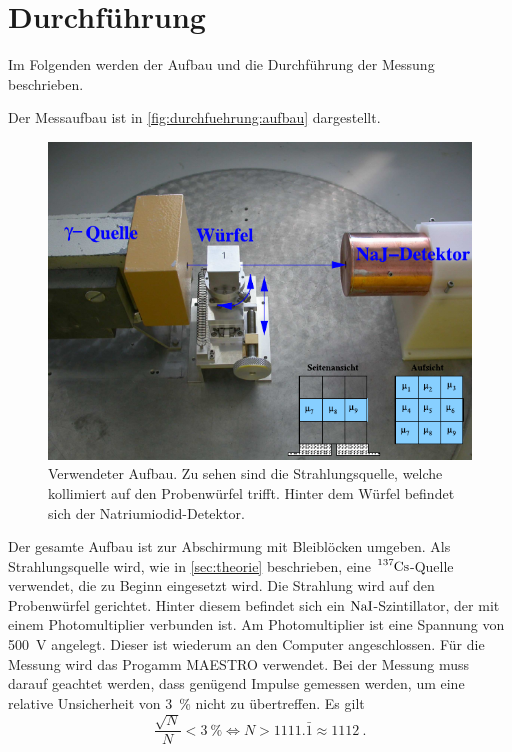 \section{Durchführung}
\label{sec:durchfuehrung}

    Im Folgenden werden der Aufbau und die Durchführung der Messung beschrieben.

    Der Messaufbau ist in \autoref{fig:durchfuehrung:aufbau} dargestellt.
    \begin{figure}
       \centering
       \includegraphics[width=\textwidth]{content/img/Abb_1.pdf}
       \caption{Verwendeter Aufbau.
       Zu sehen sind die Strahlungsquelle,
       welche kollimiert auf den Probenwürfel trifft.
       Hinter dem Würfel befindet sich der Natriumiodid-Detektor. \cite{versuchsanleitung}}
       \label{fig:durchfuehrung:aufbau}
    \end{figure}
    Der gesamte Aufbau ist zur Abschirmung mit Bleiblöcken umgeben.
    Als Strahlungsquelle wird,
    wie in \autoref{sec:theorie} beschrieben,
    eine $\ce{^{137}Cs}$-Quelle verwendet,
    die zu Beginn eingesetzt wird.
    Die Strahlung wird auf den Probenwürfel gerichtet.
    Hinter diesem befindet sich ein $\ce{NaI}$-Szintillator,
    der mit einem Photomultiplier verbunden ist.
    Am Photomultiplier ist eine Spannung von \SI{500}{\volt} angelegt.
    Dieser ist wiederum an den Computer angeschlossen.
    Für die Messung wird das Progamm MAESTRO verwendet.
    Bei der Messung muss darauf geachtet werden,
    dass genügend Impulse gemessen werden,
    um eine relative Unsicherheit von \SI{3}{\percent} nicht zu übertreffen.
    Es gilt
    \begin{equation*}
        \frac{\sqrt{N}}{N} < \SI{3}{\percent} \iff N > 1111.\bar{1} \approx 1112 \ .
    \end{equation*}

